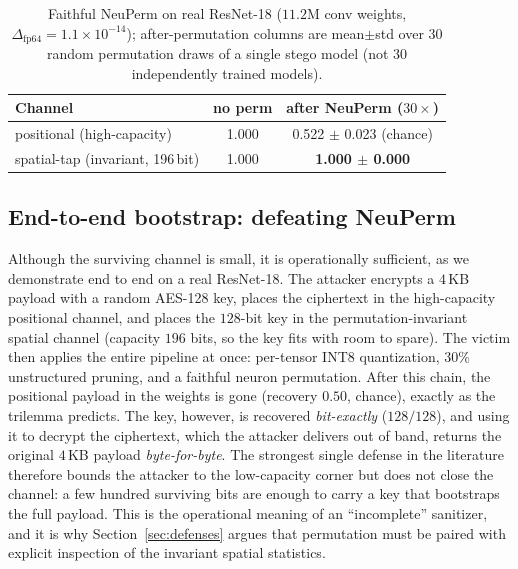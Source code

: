\documentclass[10pt,journal]{IEEEtran}
\theoremstyle{remark}
\begin{document}
\begin{table}[!tb]\centering
\caption{Faithful NeuPerm on real ResNet-18 ($11.2$M conv weights,
$\Delta_{\mathrm{fp64}}=1.1\times10^{-14}$); after-permutation columns are
mean$\pm$std over $30$ random permutation draws of a single stego model (not $30$
independently trained models).}
\label{tab:neuperm}
\begin{tabular*}{\columnwidth}{@{\extracolsep{\fill}}lcc@{}}
\toprule
Channel & no perm & after NeuPerm ($30\times$)\\
\midrule
positional (high-capacity) & 1.000 & 0.522 $\pm$ 0.023 (chance)\\
spatial-tap (invariant, 196\,bit) & 1.000 & \textbf{1.000 $\pm$ 0.000}\\
\bottomrule
\end{tabular*}
\end{table}

\subsection{End-to-end bootstrap: defeating NeuPerm}\label{sec:bootstrap}
Although the surviving channel is small, it is operationally sufficient, as we
demonstrate end to end on a real ResNet-18. The
attacker encrypts a $4$\,KB payload with a random AES-128 key, places the ciphertext in
the high-capacity positional channel, and places the $128$-bit key in the
permutation-invariant spatial channel (capacity $196$ bits, so the key fits with room to
spare). The victim then applies the entire pipeline at once: per-tensor INT8
quantization, $30\%$ unstructured pruning, and a faithful neuron permutation. After this
chain, the positional payload in the weights is gone (recovery $0.50$, chance), exactly
as the trilemma predicts. The key, however, is recovered \emph{bit-exactly}
($128/128$), and using it to decrypt the ciphertext, which the attacker delivers out of
band, returns the original $4$\,KB payload \emph{byte-for-byte}. The strongest single
defense in the literature therefore bounds the attacker to the low-capacity corner but
does not close the channel: a few hundred surviving bits are enough to carry a key that
bootstraps the full payload. This is the operational meaning of an ``incomplete''
sanitizer, and it is why Section~\ref{sec:defenses} argues that permutation must be
paired with explicit inspection of the invariant spatial statistics.
\end{document}
